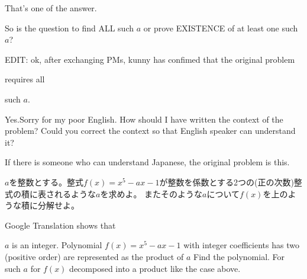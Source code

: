 \begin{solution}
	That's one of the answer.
\end{solution}



\begin{solution}
	So is the question to find ALL such $a$ or prove EXISTENCE of at least one such $a$?

EDIT: ok, after exchanging PMs, kunny has confimed that the original problem \begin{bolded}requires all \end{bolded}such $a$.
\end{solution}



\begin{solution}
	Yes.Sorry for my poor English. How should I have written the context of the problem? 
Could you correct the context so that English speaker can understand it?

If there is someone who can understand Japanese, the original problem is this.

$a$を整数とする。整式$f(x)=x^5-ax-1$が整数を係数とする2つの(正の次数)整式の積に表されるような$a$を求めよ。
またそのような$a$について$f(x)$を上のような積に分解せよ。

Google Translation shows that 

$ a $ is an integer. Polynomial $ f (x) = x ^ 5-ax-1 $ with integer coefficients has two (positive order) are represented as the product of $ a $ Find the polynomial.
For such $ a $ for $ f (x) $ decomposed into a product like the case above.
\end{solution}



